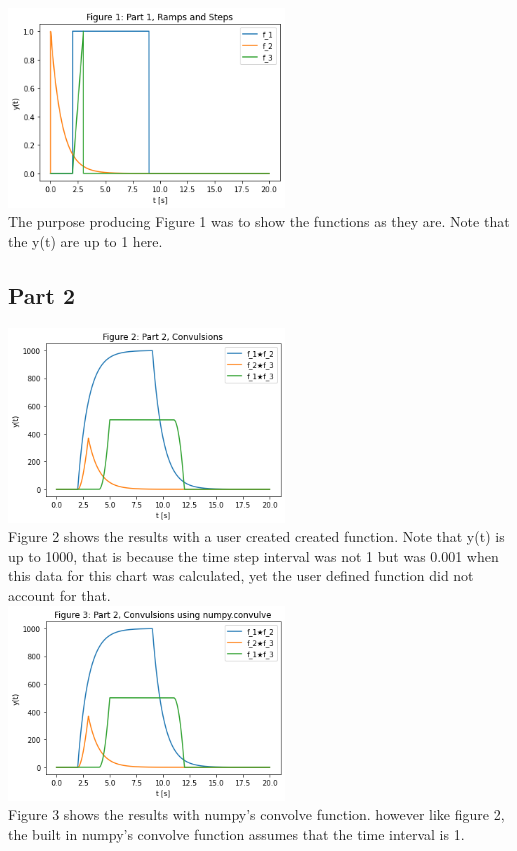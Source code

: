 \documentclass[12pt,a4paper]{article}
\begin{document}
\includegraphics[width=0.55\textwidth]{Figure1.png}\\
The purpose producing Figure 1 was to show the functions as they are. Note that the y(t) are up to 1 here.

\subsection*{Part 2}
\includegraphics[width=0.55\textwidth]{Figure2.png}\\
Figure 2 shows the results with a user created created function.  Note that y(t) is up to 1000, that is because the time step interval was not 1 but was 0.001 when this data for this chart was calculated, yet the user defined function did not account for that.\\
\includegraphics[width=0.55\textwidth]{Figure3.png}\\
Figure 3 shows the results with numpy's convolve function. however like figure 2, the built in  numpy's convolve function assumes that the time interval is 1.\\
\end{document}

